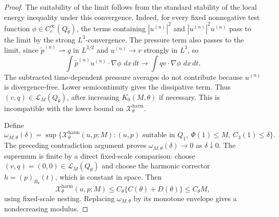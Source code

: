 \documentclass[10pt,a4paper]{amsart}
\newcommand{\calL}{\mathcal L}
\newcommand{\calX}{\mathcal X}
\newcommand{\dxdt}{\,dx\,dt}
\newcommand{\harm}{\mathrm{harm}}
\begin{document}
\begin{proof}
The suitability of the limit follows from the standard stability of the local energy inequality under this convergence.  Indeed, for every fixed nonnegative test function \(\phi\in C_c^\infty(Q_\theta)\), the terms containing \(|u^{(n)}|^2\) and \(|u^{(n)}|^2u^{(n)}\) pass to the limit by the strong \(L^3\)-convergence.  The pressure term also passes to the limit, since \(\widetilde p^{(n)}\rightharpoonup q\) in \(L^{3/2}\) and \(u^{(n)}\to v\) strongly in \(L^3\), so
\[
        \int \widetilde p^{(n)}u^{(n)}\cdot\nabla\phi\,\dxdt
        \longrightarrow
        \int qv\cdot\nabla\phi\,\dxdt .
\]
The subtracted time-dependent pressure averages do not contribute because \(u^{(n)}\) is divergence-free.  Lower semicontinuity gives the dissipative term.  Thus \((v,q)\in\calL_M(Q_\theta)\), after increasing \(K_0(M,\theta)\) if necessary.  This is incompatible with the lower bound on \(\calX^{\harm}_\theta\).

Define
\[
\omega_{M,\theta}(\delta)
=\sup\{\calX^{\harm}_\theta(u,p;M): (u,p)\text{ suitable in }Q_1,
\ \Phi(1)\le M,
\ C_3(1)\le\delta\}.
\]
The preceding contradiction argument proves \(\omega_{M,\theta}(\delta)\to0\) as \(\delta\downarrow0\).  The supremum is finite by a direct fixed-scale comparison: choose \((v,q)=(0,0)\in\calL_M(Q_\theta)\) and choose the harmonic corrector \(h=(p)_{B_\theta}(t)\), which is constant in space.  Then
\[
        \calX^{\harm}_\theta(u,p;M)
        \le C_\theta\{C(\theta)+D(\theta)\}
        \le C_\theta M,
\]
using fixed-scale nesting.  Replacing \(\omega_{M,\theta}\) by its monotone envelope gives a nondecreasing modulus.
\end{proof}
\end{document}
